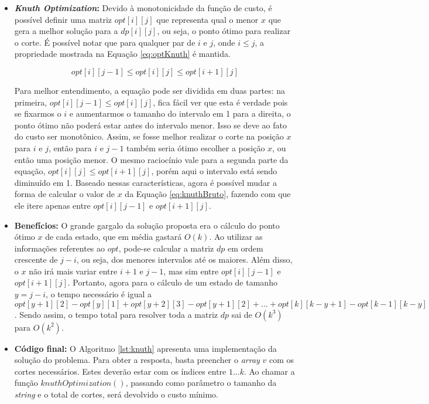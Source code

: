 \begin{itemize}[leftmargin=-.001in]
\item \textbf{\textit{Knuth Optimization}:} 
Devido à monotonicidade da função de custo, é possível definir uma matriz $opt[i][j]$ que representa qual o menor $x$ que gera a melhor solução para a $dp[i][j]$, ou seja, o ponto ótimo para realizar o corte. É possível notar que para qualquer par de $i$ e $j$, onde $i \leq j$, a propriedade mostrada na Equação \ref{eq:optKnuth} é mantida.

\begin{equation}
opt[i][j-1] \leq opt[i][j] \leq opt[i+1][j]
\label{eq:optKnuth}
\end{equation}

Para melhor entendimento, a equação pode ser dividida em duas partes: na primeira, $opt[i][j-1] \leq opt[i][j]$, fica fácil ver que esta é verdade pois se fixarmos o $i$ e aumentarmos o tamanho do intervalo em 1 para a direita, o ponto ótimo não poderá estar antes do intervalo menor. Isso se deve ao fato do custo ser monotônico. Assim, se fosse melhor realizar o corte na posição $x$ para $i$ e $j$, então para $i$ e $j-1$ também seria ótimo escolher a posição $x$, ou então uma posição menor. O mesmo raciocínio vale para a segunda parte da equação, $opt[i][j] \leq opt[i+1][j]$, porém aqui o intervalo está sendo diminuído em 1.
Baseado nessas características, agora é possível mudar a forma de calcular o valor de $x$ da Equação \ref{eq:knuthBruto}, fazendo com que ele itere apenas entre $opt[i][j-1]$ e $opt[i+1][j]$.

\item \textbf{Benefícios:}
O grande gargalo da solução proposta era o cálculo do ponto ótimo $x$ de cada estado, que em média gastará $O(k)$. Ao utilizar as informações referentes ao $opt$, pode-se calcular a matriz $dp$ em ordem crescente de $j-i$, ou seja, dos menores intervalos até os maiores. Além disso, o $x$ não irá mais variar entre $i+1$ e $j-1$, mas sim entre $opt[i][j-1]$ e $opt[i+1][j]$. Portanto, agora para o cálculo de um estado de tamanho $y = j-i$, o tempo necessário é igual a $opt[y+1][2] - opt[y][1] + opt[y+2][3] - opt[y+1][2] + ... + opt[k][k-y+1] - opt[k-1][k-y] = opt[k][k-d+1] - opt[k][1] = O(k)$. Sendo assim, o tempo total para resolver toda a matriz $dp$ sai de $O(k^3)$ para $O(k^2)$.
\item \textbf{Código final:} O Algoritmo \ref{lst:knuth} apresenta uma implementação da solução do problema. Para obter a resposta, basta preencher o \textit{array} $v$ com os cortes necessários. Estes deverão estar com os índices entre $1...k$. Ao chamar a função $knuthOptimization()$, passando como parâmetro o tamanho da \textit{string} e o total de cortes, será devolvido o custo mínimo.
\\


\end{itemize}
